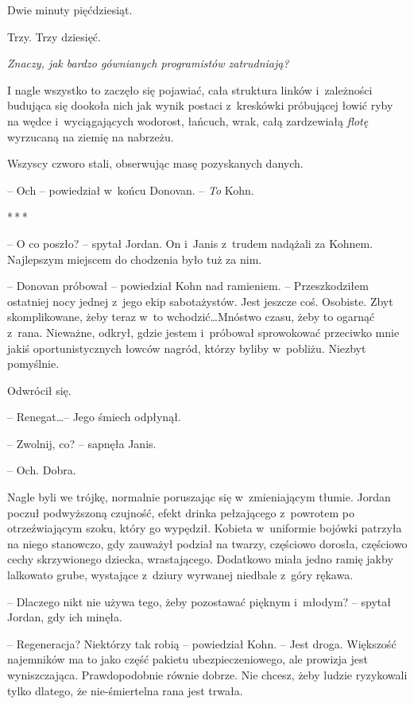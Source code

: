 \documentclass[oneside,polish,11pt,sfheadings]{mwbk}
\newcommand{\threeast}{\bigskip\par\centerline{*\,*\,*}\medskip\par}%
\begin{document}
Dwie minuty pięćdziesiąt.

Trzy. Trzy dziesięć.

\emph{Znaczy, jak bardzo gównianych programistów zatrudniają?}

I nagle wszystko to zaczęło się pojawiać, cała struktura linków i~zależności budująca się dookoła nich jak wynik postaci z~kreskówki
próbującej łowić ryby na wędce i~wyciągających wodorost, łańcuch, wrak,
całą zardzewiałą \emph{flotę} wyrzucaną na ziemię na nabrzeżu.

Wszyscy czworo stali, obserwując masę pozyskanych danych.

-- Och -- powiedział w~końcu Donovan. -- \emph{To} Kohn.

  \threeast 

-- O co poszło? -- spytał Jordan. On i~Janis z~trudem nadążali za Kohnem.
Najlepszym miejscem do chodzenia było tuż za nim.

-- Donovan próbował -- powiedział Kohn nad ramieniem. -- Przeszkodziłem
ostatniej nocy jednej z~jego ekip sabotażystów. Jest jeszcze coś.
Osobiste. Zbyt skomplikowane, żeby teraz w~to wchodzić\ldots Mnóstwo czasu,
żeby to ogarnąć z~rana. Nieważne, odkrył, gdzie jestem i~próbował
sprowokować przeciwko mnie jakiś oportunistycznych łowców nagród, którzy
byliby w~pobliżu. Niezbyt pomyślnie.

Odwrócił się. 

-- Renegat\ldots -- Jego śmiech odpłynął.

-- Zwolnij, co? -- sapnęła Janis.

-- Och. Dobra.

Nagle byli we trójkę, normalnie poruszając się w~zmieniającym tłumie.
Jordan poczuł podwyższoną czujność, efekt drinka pełzającego z~powrotem
po otrzeźwiającym szoku, który go wypędził. Kobieta w~uniformie bojówki
patrzyła na niego stanowczo, gdy zauważył podział na twarzy, częściowo
dorosła, częściowo cechy skrzywionego dziecka, wrastającego. Dodatkowo
miała jedno ramię jakby lalkowato grube, wystające z~dziury wyrwanej
niedbale z~góry rękawa.

-- Dlaczego nikt nie używa tego, żeby pozostawać pięknym i~młodym? -- spytał Jordan, gdy ich minęła.

-- Regeneracja? Niektórzy tak robią -- powiedział Kohn. -- Jest droga.
Większość najemników ma to jako część pakietu ubezpieczeniowego, ale
prowizja jest wyniszczająca. Prawdopodobnie równie dobrze. Nie chcesz,
żeby ludzie ryzykowali tylko dlatego, że nie-śmiertelna rana jest
trwała.
\end{document}
